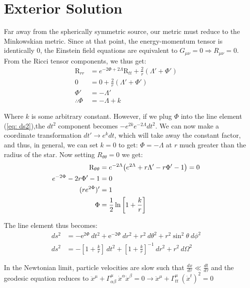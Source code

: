 \documentclass[a4paper,12pt,onehalfspacing]{report}
\begin{document}
\section{Exterior Solution}

Far away from the spherically symmetric source, our metric must reduce to the Minkowskian metric. Since at that point, the energy-momentum tensor is identically 0, the Einstein field equations are equivalent to $G_{\mu\nu}= 0 \Rightarrow R_{\mu\nu}= 0$. From the Ricci tensor components, we thus get: 
\begin{align*}
    \text{R}_{rr}&= e^{-2 \Phi+2 \Lambda}\text{R}_{tt}+ \frac{2}{r}\left(\Lambda'+ \Phi '\right)\\
    0 &= 0+ \frac{2}{r}\left(\Lambda'+ \Phi '\right)\\
    \Phi' &= -\Lambda'\\
    \therefore \Phi &= -\Lambda + k
\end{align*}

Where $k$ is some arbitrary constant. However, if we plug $\Phi$ into the line element (\cref{eq: ds2}),the $dt^2$ component becomes $-e^{2k}e^{-2\Lambda}dt^2$. We can now make a coordinate transformation $dt' \rightarrow e^k dt$, which will take away the constant factor, and thus, in general, we can set $k=0$ to get: $\Phi= -\Lambda$ at $r$ much greater than the radius of the star. Now setting $R_{\theta \theta }= 0$ we get: 
\begin{align}
    \text{R}_{\theta \theta }&=e^{-2 \Lambda } \qty(e^{2 \Lambda }+r \Lambda '-r \Phi '-1)= 0\nonumber\\
    e^{-2\Phi }-2r \Phi '-1&=0\nonumber\\
    (re^{2\Phi})'&=1\nonumber\\
    \Phi &= \frac{1}{2}\ln\left[{1+\frac{k}{r}}\right]\label{eq: Phi_step}
\end{align}

The line element thus becomes: 
\begin{align*}
    ds^2 &= -\mathrm{e}^{2\Phi}\ dt^2+ \mathrm{e}^{-2\Phi}\ dr^2+r^2\ d\theta^2+r^2\sin^2\theta\ d\phi^2\\
    ds^2 &= -\left[1+\frac{k}{r}\right]\ dt^2+ \left[1+\frac{k}{r}\right]^{-1}\ dr^2+r^2\ d\Omega^2
\end{align*}

In the Newtonian limit, particle velocities are slow such that $\frac{dx}{d\tau}\ll \frac{dt}{d\tau}$ and the geodesic equation \cite{Weinberg} reduces to $\ddot{x}^\mu + \Gamma^{\mu}_{\alpha\beta}\ \dot{x}^\alpha\dot{x}^\beta=0\rightarrow \ddot{x}^\mu + \Gamma^{\mu}_{tt}\ (\dot{x}^t)^2= 0 $
\end{document}
